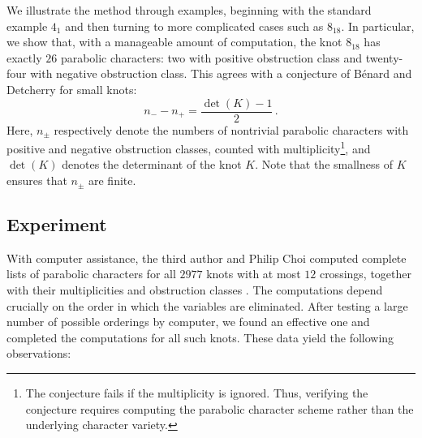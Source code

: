 \documentclass[12pt,reqno]{amsart}
\theoremstyle{definition}
\begin{document}
	We illustrate the method through examples, beginning with the standard example $4_1$ and then turning to more complicated cases such as $8_{18}$. In particular, we show that, with a manageable amount of computation, the knot $8_{18}$ has exactly $26$ parabolic characters: two with positive obstruction class and twenty-four with negative obstruction class. This agrees with a conjecture of  B\'{e}nard and Detcherry \cite{BD} for small knots:
	\begin{equation} \label{conj.bd}
		n_- - n_+ = \frac{\det(K) -1}{2}  \,.
	\end{equation}
	Here, $n_\pm$ respectively denote the numbers of nontrivial parabolic characters with positive and negative obstruction classes, counted with multiplicity\footnote{The conjecture fails if the multiplicity is ignored. Thus, verifying the conjecture requires computing the parabolic character scheme rather than the underlying character variety.}, and $\det(K)$ denotes the determinant of the knot $K$. Note that the smallness of $K$ ensures that $n_\pm$ are finite.

    
	\subsection{Experiment}
	With computer assistance, the third author and Philip Choi computed complete lists of parabolic characters for all $2977$ knots with at most $12$ crossings, together with their multiplicities and obstruction classes \cite{diagramsite}. The computations depend crucially on the order in which the variables are eliminated. After testing a large number of possible orderings by computer, we found an effective one and completed the computations for all such knots. These data yield the following observations:
	
\end{document}
